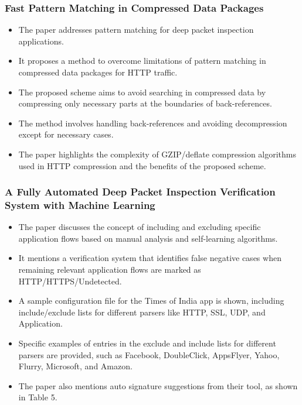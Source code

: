 \subsubsection{Fast Pattern Matching in Compressed Data Packages \cite{5700208}}
\begin{itemize}
    \item The paper addresses pattern matching for deep packet inspection applications.
    \item It proposes a method to overcome limitations of pattern matching in compressed data packages for HTTP traffic.
    \item The proposed scheme aims to avoid searching in compressed data by compressing only necessary parts at the boundaries of back-references.
    \item The method involves handling back-references and avoiding decompression except for necessary cases.
    \item The paper highlights the complexity of GZIP/deflate compression algorithms used in HTTP compression and the benefits of the proposed scheme.
\end{itemize}

\subsubsection{A Fully Automated Deep Packet Inspection Verification System with Machine Learning \cite{7947802}}
\begin{itemize}
    \item The paper discusses the concept of including and excluding specific application flows based on manual analysis and self-learning algorithms.
    \item It mentions a verification system that identifies false negative cases when remaining relevant application flows are marked as HTTP/HTTPS/Undetected.
    \item A sample configuration file for the Times of India app is shown, including include/exclude lists for different parsers like HTTP, SSL, UDP, and Application.
    \item Specific examples of entries in the exclude and include lists for different parsers are provided, such as Facebook, DoubleClick, AppsFlyer, Yahoo, Flurry, Microsoft, and Amazon.
    \item The paper also mentions auto signature suggestions from their tool, as shown in Table 5.
\end{itemize}

